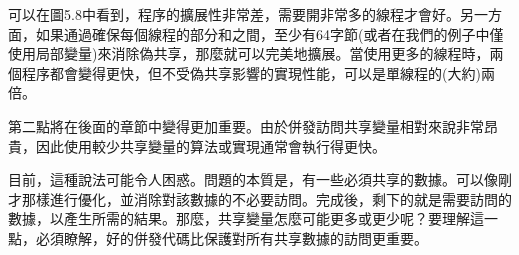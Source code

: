 可以在圖5.8中看到，程序的擴展性非常差，需要開非常多的線程才會好。另一方面，如果通過確保每個線程的部分和之間，至少有64字節(或者在我們的例子中僅使用局部變量)來消除偽共享，那麼就可以完美地擴展。當使用更多的線程時，兩個程序都會變得更快，但不受偽共享影響的實現性能，可以是單線程的(大約)兩倍。

第二點將在後面的章節中變得更加重要。由於併發訪問共享變量相對來說非常昂貴，因此使用較少共享變量的算法或實現通常會執行得更快。

目前，這種說法可能令人困惑。問題的本質是，有一些必須共享的數據。可以像剛才那樣進行優化，並消除對該數據的不必要訪問。完成後，剩下的就是需要訪問的數據，以產生所需的結果。那麼，共享變量怎麼可能更多或更少呢？要理解這一點，必須瞭解，好的併發代碼比保護對所有共享數據的訪問更重要。






































